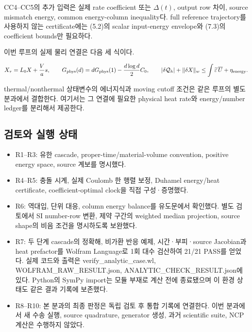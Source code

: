 CC4--CC5의 추가 입력은 실제 rate coefficient 또는 \(\Delta(t)\), output row 차이, source mismatch energy, common energy-column inequality다. full reference trajectory를 사용하지 않는 certificate에는 (5.2)의 scalar input-energy envelope와 (7.3)의 coefficient bounds만 필요하다.

이번 루프의 실제 물리 연결은 다음 세 식이다.

\[
X_\tau=L_0X+\frac Va s,\qquad
G_{\rm phys}(d)=dG_{\rm phys}(1)-\frac{d\log d}{2}C_0,\qquad
|\delta\mathcal Q_h|+\|\delta X\|_w
\le\int\widetilde\varepsilon\,\overline U+\eta_{\rm energy}.
\]

thermal/nonthermal 상태변수의 에너지식과 moving cutoff 조건은 같은 루프의 별도 분과에서 결합한다. 여기서는 그 연결에 필요한 physical heat rate와 energy/number ledger를 분리해서 제공한다.

\hypertarget{uxac80uxd1a0uxc640-uxc2e4uxd589-uxc0c1uxd0dc}{%
\subsection{검토와 실행 상태}\label{uxac80uxd1a0uxc640-uxc2e4uxd589-uxc0c1uxd0dc}}

\begin{itemize}
\tightlist
\item
  R1--R3: 유한 cascade, proper-time/material-volume convention, positive energy space, source 계보를 명시했다.
\item
  R4--R5: 충돌 시계, 실제 Coulomb 한 행렬 보정, Duhamel energy/heat certificate, coefficient-optimal clock을 직접 구성·증명했다.
\item
  R6: 역대입, 단위 대응, column energy balance를 유도문에서 확인했다. 별도 검토에서 SI number-row 변환, 제약 구간의 weighted median projection, source shape의 비음 조건을 명시하도록 보완했다.
\item
  R7: 두 단계 cascade의 정확해, 비가환 반응 예제, 시간·부피·source Jacobian과 heat prefactor를 Wolfram Language로 1회 대수 검산하여 21/21 PASS를 얻었다. 실제 코드와 출력은 verify\_analytic\_case.wl, WOLFRAM\_RAW\_RESULT.json, ANALYTIC\_CHECK\_RESULT.json에 있다. Python의 SymPy import는 모듈 부재로 계산 전에 종료됐으며 이 환경 상태도 같은 결과 기록에 보존했다.
\item
  R8--R10: 본 분과의 최종 판정은 독립 검토 후 통합 기록에 연결한다. 이번 분과에서 새 수송 실행, source quadrature, generator 생성, 과거 scientific suite, NCP 계산은 수행하지 않았다.
\end{itemize}

\clearpage

